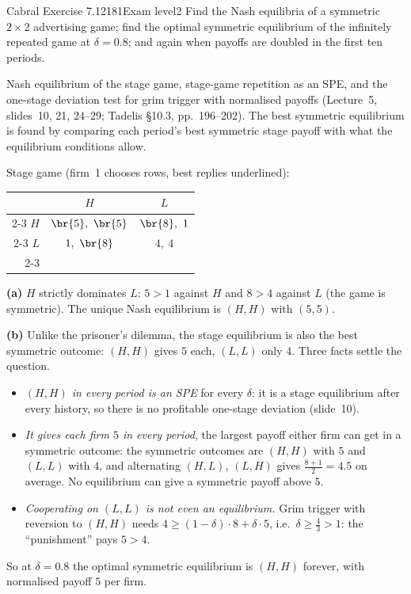\begin{exsol}{Cabral Exercise 7.12}{181}{Exam level}{2}
\asked Find the Nash equilibria of a symmetric $2\times2$ advertising game; find the optimal symmetric
equilibrium of the infinitely repeated game at $\delta = 0.8$; and again when payoffs are doubled in the
first ten periods.

\method Nash equilibrium of the stage game, stage-game repetition as an SPE, and the one-stage deviation
test for grim trigger with normalised payoffs (Lecture~5, slides~10, 21, 24--29; Tadelis
\S10.3, pp.~196--202). The best symmetric equilibrium is found by comparing each period's best symmetric
stage payoff with what the equilibrium conditions allow.

\solution
Stage game (firm~1 chooses rows, best replies underlined):
\begin{center}
\begin{tabular}{r|c|c|}
\multicolumn{1}{r}{} & \multicolumn{1}{c}{$H$} & \multicolumn{1}{c}{$L$}\\ \cline{2-3}
$H$ & $\br{5},\ \br{5}$ & $\br{8},\ 1$ \\ \cline{2-3}
$L$ & $1,\ \br{8}$ & $4,\ 4$ \\ \cline{2-3}
\end{tabular}
\end{center}

\textbf{(a)} $H$ strictly dominates $L$: $5 > 1$ against $H$ and $8 > 4$ against $L$ (the game is
symmetric). The unique Nash equilibrium is $(H,H)$ with $(5,5)$.

\textbf{(b)} Unlike the prisoner's dilemma, the stage equilibrium is also the best symmetric outcome:
$(H,H)$ gives $5$ each, $(L,L)$ only $4$. Three facts settle the question.
\begin{itemize}
  \item \emph{$(H,H)$ in every period is an SPE} for every $\delta$: it is a stage equilibrium after every
  history, so there is no profitable one-stage deviation (slide~10).
  \item \emph{It gives each firm $5$ in every period}, the largest payoff either firm can get in a
  symmetric outcome: the symmetric outcomes are $(H,H)$ with $5$ and $(L,L)$ with $4$, and alternating
  $(H,L)$, $(L,H)$ gives $\frac{8+1}{2} = 4.5$ on average. No equilibrium can give a symmetric payoff above $5$.
  \item \emph{Cooperating on $(L,L)$ is not even an equilibrium.} Grim trigger with reversion to $(H,H)$
  needs $4 \ge (1-\delta)\cdot 8 + \delta\cdot 5$, i.e.\ $\delta \ge \frac43 > 1$: the ``punishment'' pays
  $5 > 4$.
\end{itemize}
So at $\delta = 0.8$ the optimal symmetric equilibrium is $(H,H)$ forever, with normalised payoff $5$ per firm.


\end{exsol}
